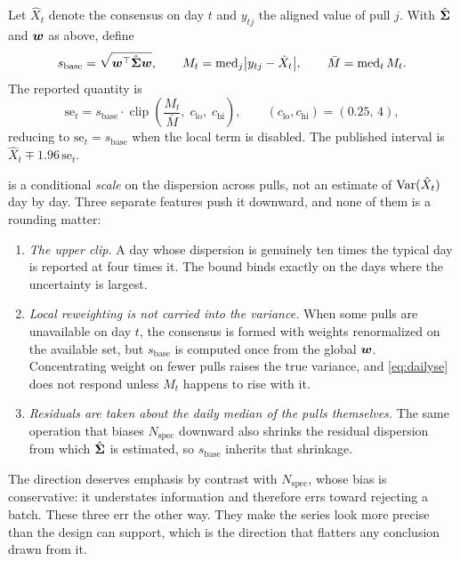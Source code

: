 \documentclass[12pt,a4paper,oneside]{article}
\begin{document}
Let $\hat{X}_t$ denote the consensus on day $t$ and $y_{tj}$ the aligned value of
pull $j$. With $\hat{\bm{\Sigma}}$ and $\bm{w}$ as above, define
\begin{equation}
s_{\text{base}}=\sqrt{\bm{w}^{\top}\hat{\bm{\Sigma}}\bm{w}},
\qquad
M_t=\operatorname{med}_j\bigl|y_{tj}-\hat{X}_t\bigr|,
\qquad
\bar{M}=\operatorname{med}_t M_t .
\end{equation}
The reported quantity is
\begin{equation}
\mathrm{se}_t
= s_{\text{base}}\cdot
\operatorname{clip}\!\left(\frac{M_t}{\bar{M}},\;c_{\text{lo}},\;c_{\text{hi}}\right),
\qquad (c_{\text{lo}},c_{\text{hi}})=(0.25,\,4),
\label{eq:dailyse}
\end{equation}
reducing to $\mathrm{se}_t=s_{\text{base}}$ when the local term is disabled. The
published interval is $\hat{X}_t\mp 1.96\,\mathrm{se}_t$.

\begin{remark}
 is a conditional \emph{scale} on the dispersion across pulls,
not an estimate of $\operatorname{Var}(\hat{X}_t)$ day by day. Three separate features push it
downward, and none of them is a rounding matter:

\begin{enumerate}
\item \emph{The upper clip.} A day whose dispersion is genuinely ten times the
typical day is reported at four times it. The bound binds exactly on the days
where the uncertainty is largest.

\item \emph{Local reweighting is not carried into the variance.} When some pulls
are unavailable on day $t$, the consensus is formed with weights renormalized on
the available set, but $s_{\text{base}}$ is computed once from the global
$\bm{w}$. Concentrating weight on fewer pulls raises the true variance, and
\eqref{eq:dailyse} does not respond unless $M_t$ happens to rise with it.

\item \emph{Residuals are taken about the daily median of the pulls
themselves.} The same operation that biases $N_{\text{spec}}$ downward also
shrinks the residual dispersion from which $\hat{\bm{\Sigma}}$ is estimated, so
$s_{\text{base}}$ inherits that shrinkage.
\end{enumerate}

The direction deserves emphasis by contrast with $N_{\text{spec}}$, whose bias is
conservative: it understates information and therefore errs toward rejecting a
batch. These three err the other way. They make the series look more precise than
the design can support, which is the direction that flatters any conclusion drawn
from it.
\end{remark}
\end{document}
